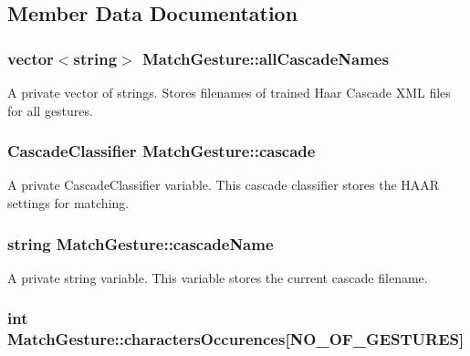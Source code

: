 \subsection{Member Data Documentation}
\hypertarget{classMatchGesture_a663e371a4051129393890b53e8d9f298}{
\subsubsection[{allCascadeNames}]{\setlength{\rightskip}{0pt plus 5cm}vector$<$string$>$ {\bf MatchGesture::allCascadeNames}}}
\label{classMatchGesture_a663e371a4051129393890b53e8d9f298}
A private vector of strings. Stores filenames of trained Haar Cascade XML files for all gestures. \hypertarget{classMatchGesture_a5f32a9342107ec1144c73c617c4d8e34}{
\subsubsection[{cascade}]{\setlength{\rightskip}{0pt plus 5cm}CascadeClassifier {\bf MatchGesture::cascade}}}
\label{classMatchGesture_a5f32a9342107ec1144c73c617c4d8e34}
A private CascadeClassifier variable. This cascade classifier stores the HAAR settings for matching. \hypertarget{classMatchGesture_a6524899aea49fa93f259cb78ca0e0f3c}{
\subsubsection[{cascadeName}]{\setlength{\rightskip}{0pt plus 5cm}string {\bf MatchGesture::cascadeName}}}
\label{classMatchGesture_a6524899aea49fa93f259cb78ca0e0f3c}
A private string variable. This variable stores the current cascade filename. \hypertarget{classMatchGesture_a57ceb174132391f082f42e58eac1866c}{
\subsubsection[{charactersOccurences}]{\setlength{\rightskip}{0pt plus 5cm}int {\bf MatchGesture::charactersOccurences}\mbox{[}NO\_\-OF\_\-GESTURES\mbox{]}}}
